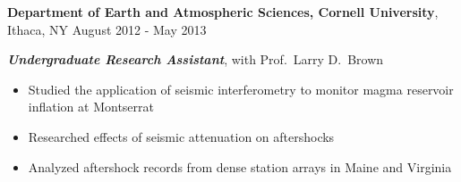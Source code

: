 
\vspace{7pt}

\textbf{Department of Earth and Atmospheric Sciences, Cornell University}, Ithaca, NY \hfill August 2012 - May 2013

\textbf{\textit{Undergraduate Research Assistant}}, with Prof.\ Larry D.\ Brown

\begin{itemize}
    \item Studied the application of seismic interferometry to monitor magma reservoir inflation at Montserrat
    \item Researched effects of seismic attenuation on aftershocks
    \item Analyzed aftershock records from dense station arrays in Maine and Virginia
\end{itemize}
